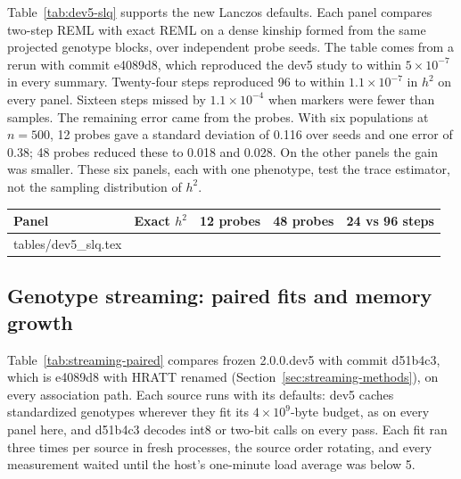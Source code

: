\documentclass[11pt]{article}
\makeatletter
\newcommand{\tabinput}[1]{\@@input #1 }
\makeatother
\begin{document}
Table~\ref{tab:dev5-slq} supports the new Lanczos defaults. Each panel
compares two-step REML with exact REML on a dense kinship formed from the
same projected genotype blocks, over independent probe seeds. The table
comes from a rerun with commit e4089d8, which reproduced the dev5 study to
within $5\times10^{-7}$ in every summary.
Twenty-four steps reproduced 96 to within $1.1\times10^{-7}$ in $h^2$ on
every panel. Sixteen steps missed by $1.1\times10^{-4}$ when markers were
fewer than samples. The remaining error came from the probes. With six
populations at $n=500$, 12 probes gave a standard deviation of 0.116 over
seeds and one error of 0.38; 48 probes reduced these to 0.018 and 0.028.
On the other panels the gain was smaller. These six panels, each with one
phenotype, test the trace estimator, not the sampling distribution of
$h^2$.

\medskip\noindent
\begin{minipage}{\textwidth}
 \centering\small
 \label{tab:dev5-slq}
 \begin{tabularx}{\textwidth}{@{}>{\raggedright\arraybackslash}Xrrrr@{}}
 \toprule
 Panel & Exact $h^2$ & 12 probes & 48 probes & 24 vs 96 steps \\
 \midrule
 \tabinput{tables/dev5_slq.tex}
 \bottomrule
 \end{tabularx}
\end{minipage}
\medskip

\subsection{Genotype streaming: paired fits and memory growth}
\label{sec:streaming-results}

Table~\ref{tab:streaming-paired} compares frozen 2.0.0.dev5 with commit
d51b4c3, which is e4089d8 with HRATT renamed (Section~\ref{sec:streaming-methods}),
on every association path. Each source runs with its defaults: dev5 caches
standardized genotypes wherever they fit its $4\times10^9$-byte budget, as on
every panel here, and d51b4c3 decodes int8 or two-bit calls on
every pass. Each fit ran three times per source in fresh processes, the source
order rotating, and every measurement waited until the host's one-minute load
average was below 5.
\end{document}
